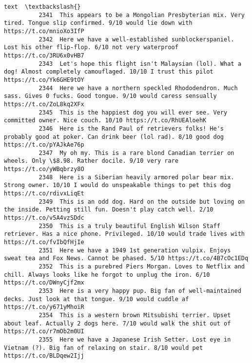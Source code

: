 \documentclass[11pt]{article}
\begin{document}
\begin{Verbatim}[commandchars=\\\{\}]
                                                                                                                                                        text  \textbackslash{}
          2341  This appears to be a Mongolian Presbyterian mix. Very tired. Tongue slip confirmed. 9/10 would lie down with https://t.co/mnioXo3IfP           
          2342  Here we have a well-established sunblockerspaniel. Lost his other flip-flop. 6/10 not very waterproof https://t.co/3RU6x0vHB7                  
          2343  Let's hope this flight isn't Malaysian (lol). What a dog! Almost completely camouflaged. 10/10 I trust this pilot https://t.co/Yk6GHE9tOY      
          2344  Here we have a northern speckled Rhododendron. Much sass. Gives 0 fucks. Good tongue. 9/10 would caress sensually https://t.co/ZoL8kq2XFx      
          2345  This is the happiest dog you will ever see. Very committed owner. Nice couch. 10/10 https://t.co/RhUEAloehK                                    
          2346  Here is the Rand Paul of retrievers folks! He's probably good at poker. Can drink beer (lol rad). 8/10 good dog https://t.co/pYAJkAe76p        
          2347  My oh my. This is a rare blond Canadian terrier on wheels. Only \$8.98. Rather docile. 9/10 very rare https://t.co/yWBqbrzy8O                   
          2348  Here is a Siberian heavily armored polar bear mix. Strong owner. 10/10 I would do unspeakable things to pet this dog https://t.co/rdivxLiqEt   
          2349  This is an odd dog. Hard on the outside but loving on the inside. Petting still fun. Doesn't play catch well. 2/10 https://t.co/v5A4vzSDdc     
          2350  This is a truly beautiful English Wilson Staff retriever. Has a nice phone. Privileged. 10/10 would trade lives with https://t.co/fvIbQfHjIe   
          2351  Here we have a 1949 1st generation vulpix. Enjoys sweat tea and Fox News. Cannot be phased. 5/10 https://t.co/4B7cOc1EDq                       
          2352  This is a purebred Piers Morgan. Loves to Netflix and chill. Always looks like he forgot to unplug the iron. 6/10 https://t.co/DWnyCjf2mx      
          2353  Here is a very happy pup. Big fan of well-maintained decks. Just look at that tongue. 9/10 would cuddle af https://t.co/y671yMhoiR             
          2354  This is a western brown Mitsubishi terrier. Upset about leaf. Actually 2 dogs here. 7/10 would walk the shit out of https://t.co/r7mOb2m0UI    
          2355  Here we have a Japanese Irish Setter. Lost eye in Vietnam (?). Big fan of relaxing on stair. 8/10 would pet https://t.co/BLDqew2Ijj            
          

\end{Verbatim}
\end{document}

